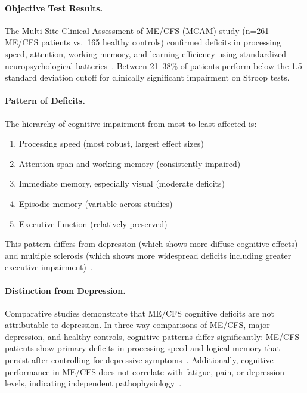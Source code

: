 \paragraph{Objective Test Results.}
The Multi-Site Clinical Assessment of ME/CFS (MCAM) study (n=261 ME/CFS patients vs.\ 165 healthy controls) confirmed deficits in processing speed, attention, working memory, and learning efficiency using standardized neuropsychological batteries~\cite{MCAM2024cognitive}. Between 21--38\% of patients perform below the 1.5 standard deviation cutoff for clinically significant impairment on Stroop tests.

\paragraph{Pattern of Deficits.}
The hierarchy of cognitive impairment from most to least affected is:
\begin{enumerate}
    \item Processing speed (most robust, largest effect sizes)
    \item Attention span and working memory (consistently impaired)
    \item Immediate memory, especially visual (moderate deficits)
    \item Episodic memory (variable across studies)
    \item Executive function (relatively preserved)
\end{enumerate}

This pattern differs from depression (which shows more diffuse cognitive effects) and multiple sclerosis (which shows more widespread deficits including greater executive impairment)~\cite{DeLuca2004comparison,Teodoro2025MECFSvsMS}.

\paragraph{Distinction from Depression.}
Comparative studies demonstrate that ME/CFS cognitive deficits are not attributable to depression. In three-way comparisons of ME/CFS, major depression, and healthy controls, cognitive patterns differ significantly: ME/CFS patients show primary deficits in processing speed and logical memory that persist after controlling for depressive symptoms~\cite{DeLuca2004comparison}. Additionally, cognitive performance in ME/CFS does not correlate with fatigue, pain, or depression levels, indicating independent pathophysiology~\cite{Teodoro2025MECFSvsMS}.

